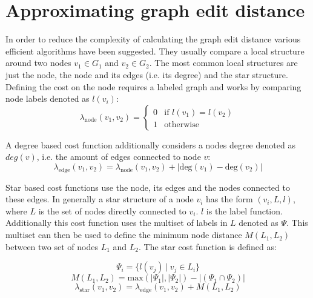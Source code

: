\documentclass[
    12pt,                               %
    DIV=14,                     %
    parskip=half+,              %
    bigheadings,                %
    cleardoubleempty,   %
    halfparskip,                %
    ]{scrreprt} %
\begin{document}
\section{Approximating graph edit distance} \label{sec:approxeditdistance}
In order to reduce the complexity of calculating the graph edit distance various efficient algorithms have been suggested. They usually compare a local structure around two nodes $v_1 \in G_1$ and $v_2 \in G_2$. The most common local structures are just the node, the node and its edges (i.e. its degree) and the star structure\cite{commoncost1, commoncost2}. \\
Defining the cost on the node requires a labeled graph and works by comparing node labels denoted as $l(v_i)$:
\begin{equation}
	\lambda_{\text{node}}(v_1, v_2) = \begin{cases}
		0 & \text{if } l(v_1) = l(v_2) \\
		1 & \text{otherwise}
	\end{cases}
\end{equation}

A degree based cost function additionally considers a nodes degree denoted as $deg(v)$, i.e. the amount of edges connected to node $v$:
\begin{equation}
	\lambda_{\text{edge}}(v_1, v_2) = \lambda_{\text{node}}(v_1, v_2) + |\text{deg}(v_1) - \text{deg}(v_2)|
\end{equation}

Star based cost functions use the node, its edges and the nodes connected to these edges. In generally a star structure of a node $v_i$ has the form $(v_i, L, l)$, where $L$ is the set of nodes directly connected to $v_i$. $l$ is the label function. Additionally this cost function uses the multiset of labels in $L$ denoted as $\Psi$. This multiset can then be used to define the minimum node distance $M(L_1, L_2)$ between two set of nodes $L_1$ and $L_2$. The star cost function is defined as\cite{compstars}:

\begin{equation}
	\Psi_i = \{ l(v_j) \: | \: v_j \in L_i \}
\end{equation}
\begin{equation}
	M(L_1, L_2) = \text{max}(|\Psi_1|, |\Psi_2|) - |(\Psi_1 \cap \Psi_2)|
\end{equation}
\begin{equation}
	\lambda_{\text{star}}(v_1, v_2) = \lambda_{\text{edge}}(v_1, v_2) + M(L_1, L_2)
\end{equation}
\end{document}
